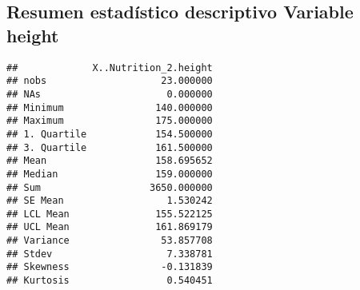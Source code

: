 \documentclass[
]{article}
\newenvironment{Shaded}{\begin{snugshade}}{\end{snugshade}}
\newcommand{\AttributeTok}[1]{\textcolor[rgb]{0.77,0.63,0.00}{#1}}
\newcommand{\DecValTok}[1]{\textcolor[rgb]{0.00,0.00,0.81}{#1}}
\newcommand{\FloatTok}[1]{\textcolor[rgb]{0.00,0.00,0.81}{#1}}
\newcommand{\FunctionTok}[1]{\textcolor[rgb]{0.00,0.00,0.00}{#1}}
\newcommand{\NormalTok}[1]{#1}
\newcommand{\OtherTok}[1]{\textcolor[rgb]{0.56,0.35,0.01}{#1}}
\newcommand{\SpecialCharTok}[1]{\textcolor[rgb]{0.00,0.00,0.00}{#1}}
\newcommand{\StringTok}[1]{\textcolor[rgb]{0.31,0.60,0.02}{#1}}
\begin{document}
\hypertarget{resumen-estaduxedstico-descriptivo-variable-height}{%
\subsection{\texorpdfstring{Resumen estadístico descriptivo Variable
\textbf{height}}{Resumen estadístico descriptivo Variable height}}\label{resumen-estaduxedstico-descriptivo-variable-height}}

\begin{Shaded}
\end{Shaded}

\begin{verbatim}
##             X..Nutrition_2.height
## nobs                    23.000000
## NAs                      0.000000
## Minimum                140.000000
## Maximum                175.000000
## 1. Quartile            154.500000
## 3. Quartile            161.500000
## Mean                   158.695652
## Median                 159.000000
## Sum                   3650.000000
## SE Mean                  1.530242
## LCL Mean               155.522125
## UCL Mean               161.869179
## Variance                53.857708
## Stdev                    7.338781
## Skewness                -0.131839
## Kurtosis                 0.540451
\end{verbatim}

\begin{Shaded}
\end{Shaded}
\end{document}
